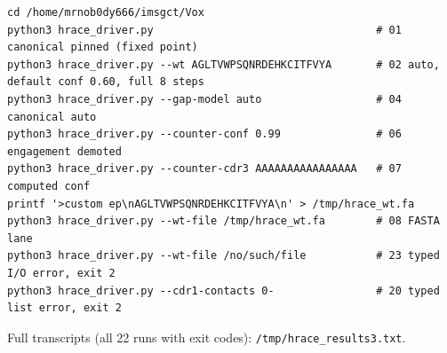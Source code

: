 \begin{verbatim}
cd /home/mrnob0dy666/imsgct/Vox
python3 hrace_driver.py                                   # 01 canonical pinned (fixed point)
python3 hrace_driver.py --wt AGLTVWPSQNRDEHKCITFVYA       # 02 auto, default conf 0.60, full 8 steps
python3 hrace_driver.py --gap-model auto                  # 04 canonical auto
python3 hrace_driver.py --counter-conf 0.99               # 06 engagement demoted
python3 hrace_driver.py --counter-cdr3 AAAAAAAAAAAAAAAA   # 07 computed conf
printf '>custom ep\nAGLTVWPSQNRDEHKCITFVYA\n' > /tmp/hrace_wt.fa
python3 hrace_driver.py --wt-file /tmp/hrace_wt.fa        # 08 FASTA lane
python3 hrace_driver.py --wt-file /no/such/file           # 23 typed I/O error, exit 2
python3 hrace_driver.py --cdr1-contacts 0-                # 20 typed list error, exit 2
\end{verbatim}

Full transcripts (all 22 runs with exit codes):
\texttt{/tmp/hrace\_results3.txt}.

